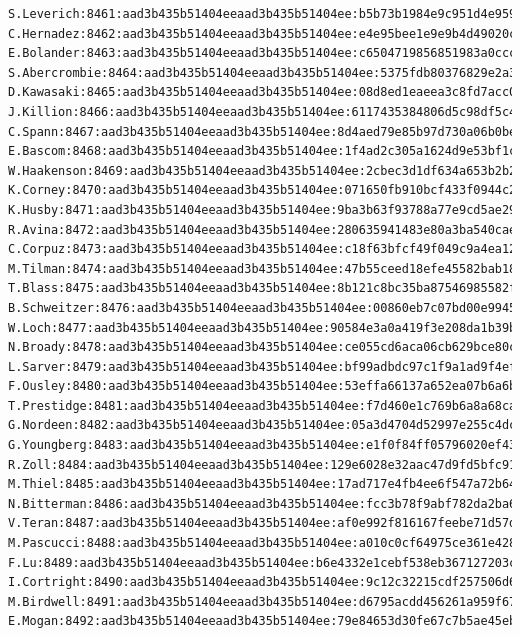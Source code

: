 \documentclass[12pt,a4paper]{article}
\begin{document}
\begin{appendices}
\begin{lstlisting}
S.Leverich:8461:aad3b435b51404eeaad3b435b51404ee:b5b73b1984e9c951d4e95924a1cbc34f:::
C.Hernadez:8462:aad3b435b51404eeaad3b435b51404ee:e4e95bee1e9e9b4d49020c3b659d85f3:::
E.Bolander:8463:aad3b435b51404eeaad3b435b51404ee:c6504719856851983a0ccc47f009ae96:::
S.Abercrombie:8464:aad3b435b51404eeaad3b435b51404ee:5375fdb80376829e2a30271aa81640c1:::
D.Kawasaki:8465:aad3b435b51404eeaad3b435b51404ee:08d8ed1eaeea3c8fd7acc06314976e36:::
J.Killion:8466:aad3b435b51404eeaad3b435b51404ee:6117435384806d5c98df5c4e3d0ae712:::
C.Spann:8467:aad3b435b51404eeaad3b435b51404ee:8d4aed79e85b97d730a06b0bea01a085:::
E.Bascom:8468:aad3b435b51404eeaad3b435b51404ee:1f4ad2c305a1624d9e53bf1c34ad6977:::
W.Haakenson:8469:aad3b435b51404eeaad3b435b51404ee:2cbec3d1df634a653b2b2a07e411a11a:::
K.Corney:8470:aad3b435b51404eeaad3b435b51404ee:071650fb910bcf433f0944c2a48234f5:::
K.Husby:8471:aad3b435b51404eeaad3b435b51404ee:9ba3b63f93788a77e9cd5ae290e35f9c:::
R.Avina:8472:aad3b435b51404eeaad3b435b51404ee:280635941483e80a3ba540cae061754d:::
C.Corpuz:8473:aad3b435b51404eeaad3b435b51404ee:c18f63bfcf49f049c9a4ea12fa5150b7:::
M.Tilman:8474:aad3b435b51404eeaad3b435b51404ee:47b55ceed18efe45582bab180dcc6ce3:::
T.Blass:8475:aad3b435b51404eeaad3b435b51404ee:8b121c8bc35ba87546985582f3329b8d:::
B.Schweitzer:8476:aad3b435b51404eeaad3b435b51404ee:00860eb7c07bd00e9945faa01877b89a:::
W.Loch:8477:aad3b435b51404eeaad3b435b51404ee:90584e3a0a419f3e208da1b39b2ec98a:::
N.Broady:8478:aad3b435b51404eeaad3b435b51404ee:ce055cd6aca06cb629bce80c7bcae5d2:::
L.Sarver:8479:aad3b435b51404eeaad3b435b51404ee:bf99adbdc97c1f9a1ad9f4efc4dd4be3:::
F.Ousley:8480:aad3b435b51404eeaad3b435b51404ee:53effa66137a652ea07b6a6b8451ac6e:::
T.Prestidge:8481:aad3b435b51404eeaad3b435b51404ee:f7d460e1c769b6a8a68ca878cfedf5ce:::
G.Nordeen:8482:aad3b435b51404eeaad3b435b51404ee:05a3d4704d52997e255c4dc0ba3fae1c:::
G.Youngberg:8483:aad3b435b51404eeaad3b435b51404ee:e1f0f84ff05796020ef43891709cfc77:::
R.Zoll:8484:aad3b435b51404eeaad3b435b51404ee:129e6028e32aac47d9fd5bfc91be3911:::
M.Thiel:8485:aad3b435b51404eeaad3b435b51404ee:17ad717e4fb4ee6f547a72b64bdc3c75:::
N.Bitterman:8486:aad3b435b51404eeaad3b435b51404ee:fcc3b78f9abf782da2ba68d9bc6902f5:::
V.Teran:8487:aad3b435b51404eeaad3b435b51404ee:af0e992f816167feebe71d57db83e0c2:::
M.Pascucci:8488:aad3b435b51404eeaad3b435b51404ee:a010c0cf64975ce361e428b701b15c91:::
F.Lu:8489:aad3b435b51404eeaad3b435b51404ee:b6e4332e1cebf538eb367127203c71ba:::
I.Cortright:8490:aad3b435b51404eeaad3b435b51404ee:9c12c32215cdf257506d6623c676a4e5:::
M.Birdwell:8491:aad3b435b51404eeaad3b435b51404ee:d6795acdd456261a959f67837d28886a:::
E.Mogan:8492:aad3b435b51404eeaad3b435b51404ee:79e84653d30fe67c7b5ae45eb3c6eb48:::

\end{lstlisting}
\end{appendices}
\end{document}

